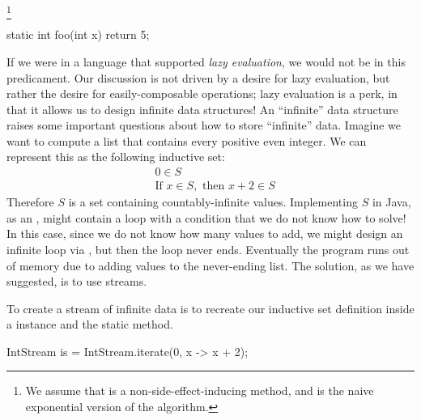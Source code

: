 \footnote{We assume that  is a non-side-effect-inducing method, and is the naive exponential version of the algorithm.} 
\begin{verbnobox}[\footnotesize]
static int foo(int x) {
  return 5;
}
\end{verbnobox}
If we were in a language that supported \textit{lazy evaluation}, we would not be in this predicament. Our discussion is not driven by a desire for lazy evaluation, but rather the desire for easily-composable operations; lazy evaluation is a perk, in that it allows us to design infinite data structures! An ``infinite'' data structure raises some important questions about how to store ``infinite'' data. Imagine we want to compute a list that contains every positive even integer. We can represent this as the following inductive set:
\begin{align*}
    &0 \in S\\
    &\text{If } x \in S,\text{ then }x + 2 \in S
\end{align*}
Therefore $S$ is a set containing countably-infinite values. Implementing $S$ in Java, as an , might contain a  loop with a condition that we do not know how to solve! In this case, since we do not know how many values to add, we might design an infinite loop via , but then the loop never ends. Eventually the program runs out of memory due to adding values to the never-ending list. The solution, as we have suggested, is to use streams.

To create a stream of infinite data is to recreate our inductive set definition inside a  instance and the  static method.

\begin{verbnobox}[\footnotesize]
IntStream is = IntStream.iterate(0, x -> x + 2);
\end{verbnobox}

